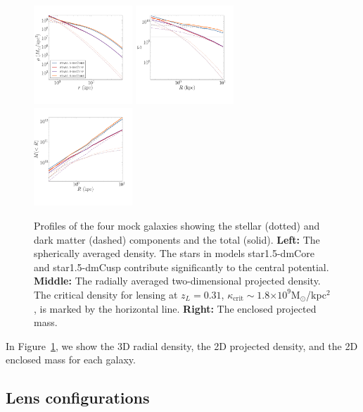 \documentclass[galley,usenatbib]{mn2e}
\newcommand{\Msun}{\ensuremath{\mathrm{M}_\odot}}
\newcommand{\figref}[1] {Figure~\ref{#1}}
\newcommand{\e}[1]{\ensuremath{\times 10^{#1}}}
\newcommand{\mockBB}{{\sc star1.5-dmCore}}
\newcommand{\mockBC}{{\sc star1.5-dmCusp}}
\begin{document}
\begin{figure}
\includegraphics[width=0.33\textwidth]{MockGalProfile-a.pdf} 
\includegraphics[width=0.33\textwidth]{MockGalProfile-b.pdf} 
\includegraphics[width=0.33\textwidth]{MockGalProfile-c.pdf}
\caption{
Profiles of the four mock galaxies showing the stellar (dotted) and dark matter (dashed) components and the total (solid).
\textbf{Left:} 
The spherically averaged density. The stars in models \mockBB{} and \mockBC{} contribute significantly to the central potential. 
\textbf{Middle:} 
The radially averaged two-dimensional projected density.
The critical density for lensing at $z_L=0.31$, $\kappa_\mathrm{crit}\sim 1.8\e{9}$\Msun/kpc$^2$, is marked by the horizontal line. 
\textbf{Right:}
The enclosed projected mass.
}
\label{mock galaxies}
\end{figure}

In \figref{mock galaxies}, we show the 3D radial density, the 2D projected
density, and the 2D enclosed mass for each galaxy.

\subsection{Lens configurations}\label{sec:lensconfig}
\end{document}
